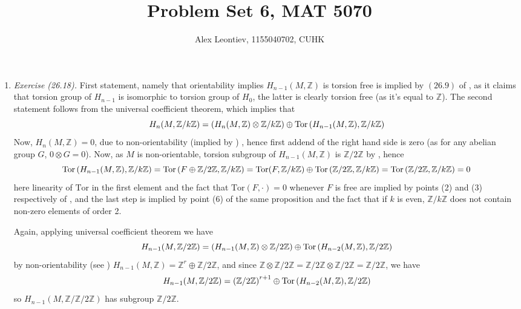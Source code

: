 \documentclass[8pt]{article} %
\title{Problem Set 6, MAT 5070}
\author{Alex Leontiev, 1155040702, CUHK}
\newcommand{\Z}{\mathbb{Z}}
\newcommand{\kZ}{\mathbb{Z}/k\mathbb{Z}}
\newcommand{\tZ}{\mathbb{Z}/2\mathbb{Z}}
\newcommand{\Tor}{\mbox{Tor}}
\begin{document}
\maketitle
\begin{enumerate}[label=\bfseries \arabic*.]
	\item{{\it Exercise (26.18). }First statement, namely that orientability implies $H_{n-1}(M,\mathbb{Z})$ is torsion free is implied
		by $(26.9)$ of \cite{gh}, as it claims that torsion group of $H_{n-1}$ is isomorphic to torsion group of $H_0$, the latter
		is clearly torsion free (as it's equal to $\mathbb{Z}$). The second statement follows from the universal coefficient
		theorem, which implies that
		\[H_n(M,\mathbb{Z}/k\mathbb{Z})=\mybra{H_n(M,\mathbb{Z})\otimes\kZ}\oplus\Tor\mybra{H_{n-1}(M,\Z),\kZ}\]
		Now, $H_n(M,\mathbb{Z})=0$, due to non-orientability (implied by \cite[Theorem 3.26(b)]{hatcher})
		, hence first addend of the right hand side
		is zero (as for any abelian group $G$, $0\otimes G=0$). Now, as $M$ is non-orientable, torsion subgroup of $H_{n-1}(M,\Z)$
		is $\mathbb{Z}/2\mathbb{Z}$ by \cite[Corollary 3.28]{hatcher}, hence 
		\[\Tor\mybra{H_{n-1}(M,\Z),\kZ}=\Tor\mybra{F\oplus\mathbb{Z}/2\mathbb{Z},\kZ}=\Tor(F,\kZ)\oplus\Tor\mybra{\mathbb{Z}/2\mathbb{Z}
		,\kZ}=\Tor\mybra{\mathbb{Z}/2\mathbb{Z},\kZ}=0\]
		here linearity of $\Tor$ in the first element and the fact that $\Tor(F,\cdot)=0$ whenever $F$ is free are implied by points
		(2) and (3) respectively of \cite[Proposition 3A.5]{hatcher}, and the last step is implied by point (6) of the same proposition
		and the fact that if $k$ is even, $\kZ$ does not contain non-zero elements of order 2.

		Again, applying universal coefficient theorem we have
		\[H_{n-1}(M,\mathbb{Z}/2\mathbb{Z})=\mybra{H_{n-1}(M,\mathbb{Z})\otimes\tZ}\oplus\Tor\mybra{H_{n-2}(M,\Z),\tZ}\]
		by non-orientability (see \cite[Corollary 3.28]{hatcher}) $H_{n-1}(M,\Z)=\Z^r\oplus\tZ$, and since $\Z\otimes\tZ=\tZ\otimes\tZ=
		\tZ$, we have
		\[H_{n-1}(M,\mathbb{Z}/2\mathbb{Z})=\mybra{\tZ}^{r+1}\oplus\Tor\mybra{H_{n-2}(M,\Z),\tZ}\]
		so $H_{n-1}(M,\Z/\tZ)$ has subgroup $\tZ$.

}
\end{enumerate}
\end{document}
